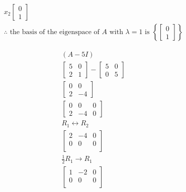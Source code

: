 \documentclass[12pt letter]{report}
\begin{document}
{\begin{align*}
    x_2
    \begin{bmatrix} 0
      \\ 1
    \end{bmatrix}                                                                            \\
    \therefore \text{ the basis of the eigenspace of $A$ with $\lambda = 1$ is } \left\{ \begin{bmatrix} 0 \\ 1 \end{bmatrix}  \right\}
  \end{align*}

  \begin{align*}
    \left( A - 5 I \right)                                                                      \\
    \begin{bmatrix} 5 & 0 \\ 2 & 1 \end{bmatrix} - \begin{bmatrix} 5 & 0 \\ 0 & 5 \end{bmatrix} \\
    \begin{bmatrix}
      0 & 0  \\
      2 & -4
    \end{bmatrix}                                                                              \\
    \begin{bmatrix}
      0 & 0  & 0 \\
      2 & -4 & 0
    \end{bmatrix}                                                                              \\
    R_1 \leftrightarrow R_2                                                                     \\
    \begin{bmatrix}
      2 & -4 & 0 \\
      0 & 0  & 0 \\
    \end{bmatrix}
    \\
    \frac{1}{2}R_1 \to R_1                                                                      \\
    \begin{bmatrix}
      1 & -2 & 0 \\
      0 & 0  & 0 \\
    \end{bmatrix}

\end{align*}}
\end{document}
